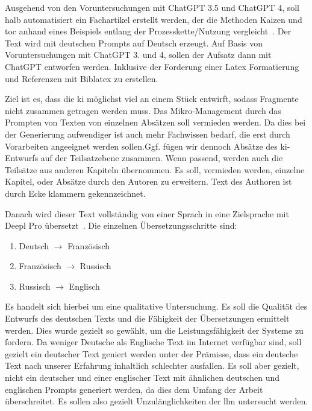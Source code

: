 
Ausgehend von den Voruntersuchungen mit ChatGPT 3.5 und ChatGPT 4, soll halb automatisiert ein Fachartikel erstellt werden,
der die Methoden Kaizen und \gls{toc} anhand eines Beispiels entlang der Prozesskette/Nutzung vergleicht~\cite{openai_chatgpt_nodate}. 
Der Text wird mit deutschen Prompts auf Deutsch erzeugt. Auf Basis von Voruntersuchungen mit ChatGPT 3. und 4, sollen der Aufsatz dann mit ChatGPT entworfen werden. Inklusive der Forderung einer Latex Formatierung und Referenzen mit Biblatex zu erstellen.

Ziel ist es, dass die \gls{ki} möglichst viel an einem Stück entwirft, sodass Fragmente nicht zusammen getragen werden muss. Das Mikro-Management durch das Prompten von Texten von einzelnen Absätzen soll vermieden werden. Da dies bei der Generierung aufwendiger ist auch mehr Fachwissen bedarf, die erst durch Vorarbeiten angeeignet werden sollen.Ggf. fügen wir dennoch Absätze des \gls{ki}-Entwurfs auf der Teilsatzebene zusammen. Wenn passend, werden auch die Teilsätze aus anderen Kapiteln übernommen. Es soll, vermieden werden, einzelne Kapitel, oder Absätze durch den Autoren zu erweitern. Text des Authoren ist durch Ecke klammern gekennzeichnet.

Danach wird dieser Text vollständig von einer Sprach in eine Zielsprache mit Deepl Pro übersetzt~\cite{deepl_deepl_nodate}.
Die einzelnen Übersetzungsschritte sind:

\begin{enumerate}
	\item Deutsch $\rightarrow$ Französisch
	\item Französisch $\rightarrow$ Russisch
	\item Russisch $\rightarrow$ Englisch
\end{enumerate}

Es handelt sich hierbei um eine qualitative Untersuchung. Es soll die Qualität des Entwurfs des deutschen Texts und die Fähigkeit der Übersetzungen ermittelt werden. Dies wurde gezielt so gewählt, um die Leistungsfähigkeit der Systeme zu fordern. Da weniger Deutsche als Englische Text im Internet verfügbar sind, soll gezielt ein deutscher Text geniert werden unter der Prämisse, dass ein deutsche Text nach unserer Erfahrung inhaltlich schlechter ausfallen. Es soll aber gezielt, nicht ein deutscher und einer englischer Text mit ähnlichen deutschen und englischen Prompts generiert werden, da dies dem Umfang der Arbeit überschreitet. Es sollen also gezielt Unzulänglichkeiten der \gls{llm} untersucht werden.

